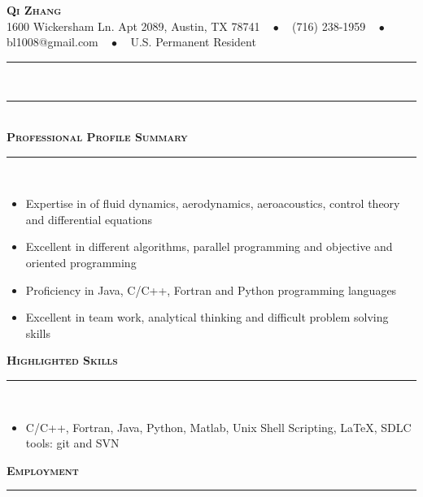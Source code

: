 \documentclass[11pt]{article}
\begin{document}
\begin{center}
{\Huge\textbf{\textsc{{Qi Zhang}}}} \\[5pt]
1600 Wickersham Ln. Apt 2089, Austin, TX 78741 $\text{ }\bullet\text{ }$ (716) 238-1959 $\text{ }\bullet\text{ }$  bl1008@gmail.com $\text{ }\bullet\text{ }$ U.S. Permanent Resident 
\end{center}
 \rule[0.8em]{\textwidth}{0.5pt} \\[-11pt]
 \rule[0.8em]{\textwidth}{0.5pt} \\[0pt]
\textbf{\textsc{\LARGE{Professional Profile Summary}}} \\ \rule[0.8em]{\textwidth}{0.5pt} \\[-20pt]
\begin{itemize}[topsep=0pt,partopsep=0pt,leftmargin=16pt]
\item Expertise in of fluid dynamics, aerodynamics, aeroacoustics, control theory and differential equations 
\item Excellent in different algorithms, parallel programming and objective and oriented programming
\item Proficiency in Java, C/C++, Fortran and Python programming languages
\item Excellent in team work, analytical thinking and difficult problem solving skills
\end{itemize}
\vspace{4pt}
\textbf{\textsc{\LARGE{Highlighted Skills}}} \\ \rule[0.8em]{\textwidth}{0.5pt} \\[-18pt]
\vspace{-4pt}
\begin{itemize}[topsep=0pt,partopsep=0pt,leftmargin=16pt]
\item
C/C++, 
Fortran, 
Java,
Python, 
Matlab, 
Unix Shell Scripting, 
\LaTeX,
SDLC tools: git and SVN
\end{itemize}
\vspace{4pt}
\textbf{\textsc{\LARGE{Employment}}} \\ \rule[0.8em]{\textwidth}{0.5pt} \\[-16pt]
\\
\end{document}
